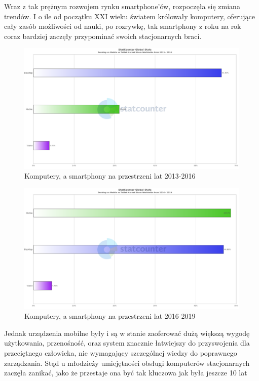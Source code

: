 \documentclass[12pt, a4paper]{article}
\begin{document}
\begin{sloppypar}
{{    Wraz z tak prężnym rozwojem rynku smartphone'ów, rozpoczęła się zmiana trendów.
    I o ile od początku XXI wieku światem królowały komputery, oferujące cały zasób 
    możliwości od nauki, po rozrywkę, tak smartphony z roku na rok coraz bardziej 
    zaczęły przypominać swoich stacjonarnych braci. 
    \begin{figure}[H]
      \centering
      \includegraphics[width=.9\textwidth]{systems_chart1.png}
      \caption{Komputery, a smartphony na przestrzeni lat 2013-2016}
      \label{fig:2013}
    \end{figure} 
    \begin{figure}[H]
      \centering
      \includegraphics[width=.9\textwidth]{systems_chart2.png}
      \caption{Komputery, a smartphony na przestrzeni lat 2016-2019}
      \label{fig:2016}
    \end{figure} 
    Jednak urządzenia mobilne były i są w stanie zaoferować dużą większą wygodę 
    użytkowania, przenośność, oraz system znacznie łatwiejszy do przyswojenia dla 
    przeciętnego człowieka, nie wymagający szczególnej wiedzy do poprawnego
    zarządzania. Stąd u młodzieży umiejętności obsługi komputerów stacjonarnych
    zaczęła zanikać, jako że przestaje ona być tak kluczowa jak była jeszcze 10 lat
}}
\end{sloppypar}
\end{document}

